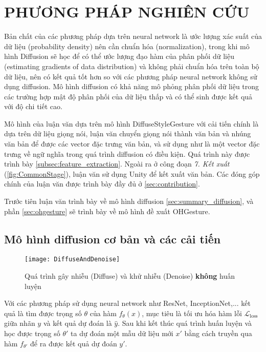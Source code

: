 \chapter{PHƯƠNG PHÁP NGHIÊN CỨU}
\label{chap:Chapter3}

Bản chất của các phương pháp dựa trên neural network là ước lượng xác suất của dữ liệu (probability density) nên cần chuẩn hóa (normalization), trong khi mô hình Diffusion sẽ học để có thể ước lượng đạo hàm của phân phối dữ liệu \cite{song2021score} (estimating gradients of data distribution) và không phải chuẩn hóa trên toàn bộ dữ liệu, nên có kết quả tốt hơn so với các phương pháp neural network không sử dụng diffusion. Mô hình diffusion có khả năng mô phỏng phân phối dữ liệu trong các trường hợp mật độ phân phối của dữ liệu thấp và có thể sinh được kết quả với độ chi tiết cao.

Mô hình của luận văn dựa trên mô hình DiffuseStyleGesture \cite{yang2022DiffuseStyleGestureplus} với cải tiến chính là dựa trên dữ liệu giọng nói, luận văn chuyển giọng nói thành văn bản và nhúng văn bản để được các vector đặc trưng văn bản, và sử dụng như là một vector đặc trưng về ngữ nghĩa trong quá trình diffusion có điều kiện. Quá trình này được trình bày \autoref{subsec:feature_extraction}. Ngoài ra ở công đoạn \textit{7. Kết xuất}  (\autoref{fig:CommonStage}), luận văn sử dụng Unity để kết xuất văn bản. Các đóng góp chính của luận văn được trình bày đầy đủ ở \autoref{sec:contribution}.

Trước tiên luận văn trình bày về mô hình diffusion \autoref{sec:summary_diffusion}, và phần \autoref{sec:ohgesture} sẽ trình bày về mô hình đề xuất OHGesture.

\section{Mô hình diffusion cơ bản và các cải tiến}
\label{sec:summary_diffusion}

\begin{figure}[H]
	\centering
	\texttt{[image: DiffuseAndDenoise]}
	\caption{Quá trình gây nhiễu (Diffuse) và khử nhiễu (Denoise) \textbf{không} huấn luyện}
	\label{fig:DiffuseAndDenoise}
\end{figure}

Với các phương pháp sử dụng neural network như ResNet, InceptionNet,... kết quả là tìm được trọng số $\theta$ của hàm $f_{\theta}(x)$, mục tiêu là tối ưu hóa hàm lỗi $\mathcal{L}_\text{loss}$ giữa nhãn $y$ và kết quả dự đoán là $\hat{y}$. Sau khi kết thúc quá trình huấn luyện và học được trọng số $\theta'$ ta dự đoán một mẫu dữ liệu mới $x'$ bằng cách truyền qua hàm $f_{\theta'}$ để ra được kết quả dự đoán $y'$.

